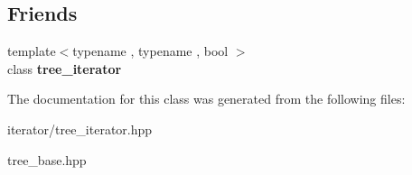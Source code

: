 \subsection*{Friends}
\begin{DoxyCompactItemize}
\item 
{\footnotesize template$<$typename , typename , bool $>$ }\\class {\bfseries tree\+\_\+iterator}\hypertarget{classds_1_1tree__base_a3eb98ccc605b2d7c29a9caa36be1fa69}{}\label{classds_1_1tree__base_a3eb98ccc605b2d7c29a9caa36be1fa69}

\end{DoxyCompactItemize}


The documentation for this class was generated from the following files\+:\begin{DoxyCompactItemize}
\item 
iterator/tree\+\_\+iterator.\+hpp\item 
tree\+\_\+base.\+hpp\end{DoxyCompactItemize}
